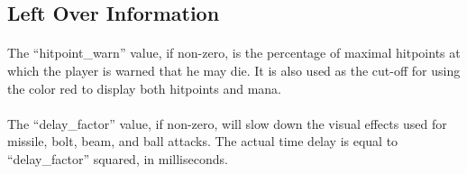 \subsection{Left Over Information}
\paragraph{}The ``hitpoint\_warn'' value, if non-zero, is the percentage
of maximal hitpoints at which the player is warned that he may die. It
is also used as the cut-off for using the color red to display both
hitpoints and mana.

\paragraph{}The ``delay\_factor'' value, if non-zero, will slow down the
visual effects used for missile, bolt, beam, and ball attacks. The
actual time delay is equal to ``delay\_factor'' squared, in
milliseconds.

